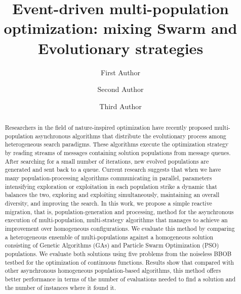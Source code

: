 \documentclass[runningheads]{llncs}
\begin{document}
\title{Event-driven multi-population optimization: mixing Swarm and Evolutionary strategies}
\author{First Author \and
Second Author \and
Third Author}
%

%
\maketitle              %
%
\begin{abstract}

Researchers in the field of nature-inspired optimization have recently
proposed multi-population asynchronous algorithms that distribute the
evolutionary process among heterogeneous search paradigms. These
algorithms execute the optimization strategy by reading streams of
messages containing solution populations from message queues. After
searching for a small number of iterations, new evolved populations
are generated and sent back to a queue. Current research suggests that
when we have many population-processing algorithms communicating in
parallel, parameters intensifying exploration or exploitation in each
population strike a dynamic that balances the two, exploring and
exploiting simultaneously, maintaining an overall diversity, and
improving the search.  In this work, we propose a simple reactive
migration, that is, population-generation and processing, method for
the asynchronous execution of multi-population, multi-strategy
algorithms that manages to achieve an improvement over homogeneous
configurations. We evaluate this method by comparing a heterogeneous
ensemble of multi-populations against a homogeneous solution
consisting of Genetic Algorithms (GAs) and Particle Swarm Optimization
(PSO) populations. We evaluate both solutions using five problems from
the noiseless BBOB testbed for the optimization of continuous
functions. Results show that compared with other asynchronous
homogeneous population-based algorithms, this method offers better
performance in terms of the number of evaluations needed to find a
solution and the number of instances where it found it.

\end{abstract}
%
%
%
\end{document}
